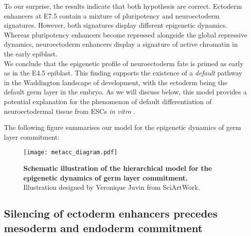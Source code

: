 To our surprise, the results indicate that both hypothesis are correct. Ectoderm enhancers at E7.5 contain a mixture of pluripotency and neuroectoderm signatures. However, both signatures display different epigenetic dynamics. Whereas pluripotency enhancers become repressed alongside the global repressive dynamics, neuroectoderm enhancers display a signature of active chromatin in the early epiblast.\\
We conclude that the epigenetic profile of neuroectoderm fate is primed as early as in the E4.5 epiblast. This finding supports the existence of a \textit{default} pathway in the
Waddington landscape of development, with the ectoderm being the default germ layer in the embryo. As we will discuss below, this model provides a potential explanation for the phenomenon of default differentiation of neuroectodermal tissue from ESCs \textit{in vitro} \cite{Munoz2002,Hemmati-Brivanlou1997}.

The following figure summarises our model for the epigenetic dynamics of germ layer commitment:

\begin{figure}[]
	\texttt{[image: metacc\_diagram.pdf]}
	\caption{
	\textbf{Schematic illustration of the hierarchical model for the epigenetic dynamics of germ layer commitment.} \\
	Illustration designed by Veronique Juvin from SciArtWork. }
	\label{fig:metacc_diagram}
\end{figure}


\subsection{Silencing of ectoderm enhancers precedes mesoderm and endoderm commitment}

